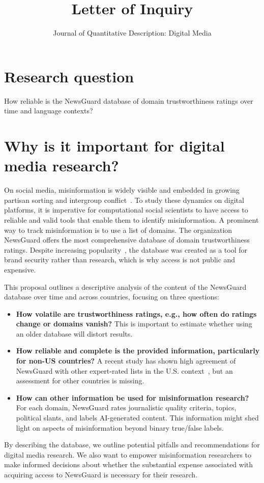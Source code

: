 \documentclass[12pt]{article}
\title{Letter of Inquiry}
\author{Journal of Quantitative Description: Digital Media}
\begin{document}
\maketitle

\section*{Research question}
How reliable is the NewsGuard database of domain trustworthiness ratings over time and language contexts?

\section*{Why is it important for digital media research?}
On social media, misinformation is widely visible \citep{lazerScienceFakeNews2018} and embedded in growing partisan sorting and intergroup conflict~\citep{gonzalez-bailonAsymmetricIdeologicalSegregation2023a}. To study these dynamics on digital platforms, it is imperative for computational social scientists to have access to reliable and valid tools that enable them to identify misinformation. A prominent way to track misinformation is to use a list of domains. The organization NewsGuard offers the most comprehensive database of domain trustworthiness ratings. Despite increasing popularity~\citep[for example,][]{robertsonUsersChooseEngage2023a,lasserSocialMediaSharing2022a}, the database was created as a tool for brand security rather than research, which is why access is not public and expensive. 

This proposal outlines a descriptive analysis of the content of the NewsGuard database over time and across countries, focusing on three questions:
\begin{itemize}
    \item \textbf{How volatile are trustworthiness ratings, e.g., how often do ratings change or domains vanish?} This is important to estimate whether using an older database will distort results.
    \item \textbf{How reliable and complete is the provided information, particularly for non-US countries?} A recent study has shown high agreement of NewsGuard with other expert-rated lists in the U.S. context~\citep{linHighLevelCorrespondence2023}, but an assessment for other countries is missing. 
    \item \textbf{How can other information be used for misinformation research?} For each domain, NewsGuard rates journalistic quality criteria, topics, political slants, and labels AI-generated content. This information might shed light on aspects of misinformation beyond binary true/false labels.
\end{itemize}
By describing the database, we outline potential pitfalls and recommendations for digital media research. We also want to empower misinformation researchers to make informed decisions about whether the substantial expense associated with acquiring access to NewsGuard is necessary for their research. 
\end{document}
